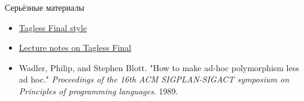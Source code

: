     \begin{frame}{Серьёзные материалы}
        \begin{itemize}
            \item \href{https://okmij.org/ftp/tagless-final/index.html}{\color{blue} Tagless Final style}
            \item \href{https://okmij.org/ftp/tagless-final/course/lecture.pdf}{\color{blue} Lecture notes on Tagless Final}
            \item Wadler, Philip, and Stephen Blott. "How to make ad-hoc polymorphism less ad hoc." \textit{Proceedings of the 16th ACM SIGPLAN-SIGACT symposium on Principles of programming languages}. 1989.
        \end{itemize}
    \end{frame}


